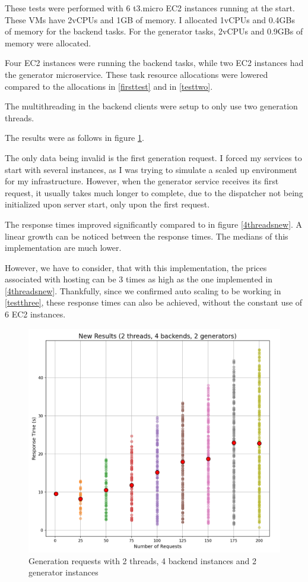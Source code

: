 				These tests were performed with 6 t3.micro EC2 instances running at the start. 
				These VMs have 2vCPUs and 1GB of memory. I allocated
				1vCPUs and 0.4GBs of memory for the backend tasks. 
				For the generator tasks, 2vCPUs and 0.9GBs of memory were allocated.

				Four EC2 instances were running the backend tasks, while two EC2 instances had the generator microservice.
				These task resource allocations were lowered compared to the allocations in \ref{firsttest} and in \ref{testtwo}.

				The multithreading in the backend clients were setup to only use two generation threads.

				The results were as follows in figure \ref{2threads4web2gen}.

				The only data being invalid is the first generation request. I forced my services to start with several instances, as I was trying to 
				simulate a scaled up environment for my infrastructure. However, when the generator service receives its first request, it usually takes
				much longer to complete, due to the dispatcher not being initialized upon server start, only upon the first request.

				The response times improved significantly compared to in figure \ref{4threadsnew}. A linear growth can be noticed between the response times.
				The medians of this implementation are much lower. 
				
				However, we have to consider, that with this implementation, the prices associated with hosting
				can be 3 times as high as the one implemented in \ref{4threadsnew}. Thankfully, since we confirmed auto scaling to be working in \ref{testthree},
				these response times can also be achieved, without the constant use of 6 EC2 instances.

				\begin{figure}[h]
					\begin{center}
						\includegraphics[scale=0.6]{include/imgs/2t_4w_2g_new.PNG}
						\caption{Generation requests with 2 threads, 4 backend instances and 2 generator instances}
						\label{2threads4web2gen}
					\end{center}
				\end{figure}

			

